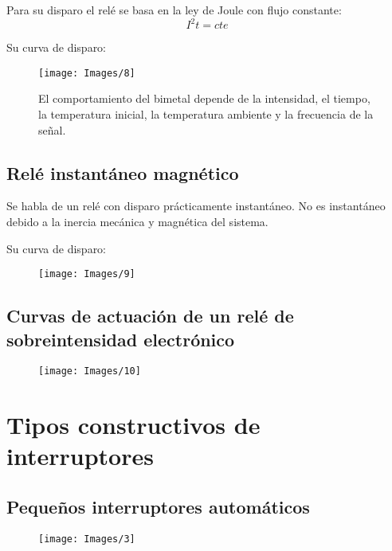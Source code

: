 Para su disparo el relé se basa en la ley de Joule con flujo constante:
\begin{equation}
	I^2t=cte
\end{equation}

Su curva de disparo:
\begin{figure}[H]
	\centering
	\begin{minipage}{0.6\textwidth}
		\centering
		\texttt{[image: Images/8]}
	\end{minipage}
	\begin{minipage}{0.35\textwidth}
		El comportamiento del bimetal depende de la intensidad, el tiempo, la temperatura inicial, la temperatura ambiente y la frecuencia de la señal.
	\end{minipage}
\end{figure}	
\subsection{Relé instantáneo magnético}
Se habla de un relé con disparo prácticamente instantáneo. No es instantáneo debido a la inercia mecánica y magnética del sistema.
\newline

Su curva de disparo:
\begin{figure}[H]
	\centering
	\texttt{[image: Images/9]}
	\label{fig:9}
\end{figure}

\subsection{Curvas de actuación de un relé de sobreintensidad electrónico}
\begin{figure}[H]
	\centering
	\texttt{[image: Images/10]}
	\label{fig:10}
\end{figure}

\section{Tipos constructivos de interruptores}
\subsection{Pequeños interruptores automáticos}
\begin{figure}[H]
	\centering
	
	\texttt{[image: Images/3]}
	\label{fig:3}
\end{figure}

